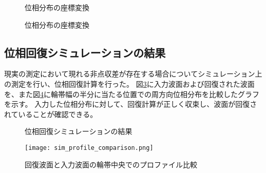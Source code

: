 \begin{figure}[!ht]
\centering
{}
\caption[]{位相分布の座標変換}
\label{fig:unwrap_transform}
\end{figure}

\begin{figure}[!ht]
\centering
{}
\caption[]{位相分布の座標変換}
\label{fig:unwrap_path}
\end{figure}

\subsection{位相回復シミュレーションの結果}
\label{chap3_transverse_simulation_result}

現実の測定において現れる非点収差が存在する場合についてシミュレーション上の測定を行い、位相回復計算を行った。
図\ref{fig:sim_transverse}に入力波面および回復された波面を、また図\ref{fig:sim_profile_comparison}に輪帯幅の半分に当たる位置での周方向位相分布を比較したグラフを示す。
入力した位相分布に対して、回復計算が正しく収束し、波面が回復されていることが確認できる。

\begin{figure}[!ht]
\centering
{}
\caption[]{位相回復シミュレーションの結果}
\label{fig:sim_transverse}
\end{figure}

\begin{figure}[ht]
\centering
\texttt{[image: sim\_profile\_comparison.png]}
\caption{回復波面と入力波面の輪帯中央でのプロファイル比較}
\label{fig:sim_profile_comparison}
\end{figure}

\clearpage
\newpage

